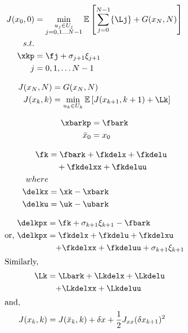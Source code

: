 \documentclass[varwidth]{standalone}
\providecommand{\Jzero}{J(x_0, 0)}
\providecommand{\Jk}{J(x_k, k)}
\providecommand{\JN}{J(x_N, N)}
\providecommand{\Jbark}{J(\bar{x}_k, k)}
\providecommand{\Jkp}{J(x_{k+1}, k+1)}
\providecommand{\Jkdelx}{\delta x }
\providecommand{\Jkdelx}{J_x \delta x_{k}}
\providecommand{\Jkdelxx}{\frac{1}{2} J_{xx} (\delta x_{k+1})^2}
\providecommand{\GN}{G(x_N, N)}
\providecommand{\noisekp}{\sigma_{k+1} \xi_{k+1}}
\providecommand{\noisejp}{\sigma_{j+1} \xi_{j+1}}
\begin{document}
\begin{minipage}{0.8\linewidth}

    \begin{align}
        \Jzero &= \min_{
            \substack{
                u_j \in U_j \\
                j = 0, 1 \dots N-1 \\
            }
        }
        \mathbb{E} \left[ \sum_{j=0}^{N-1} \{\Lj\} + \GN\right] \nonumber\\
        s.t. &{} \\
        \xkp &= \fj + \noisejp \nonumber\\
        j &= 0, 1, \dots N-1 \nonumber
    \end{align}

    \begin{align}
        \JN &= \GN  \\
        \Jk &= \min_{u_k \in U_k} \mathbb{E} \left[ 
            \Jkp + \Lk 
        \right]
    \end{align}

    \begin{align}
        \xbarkp &= \fbark \\
        \bar{x}_0 &= x_0 \nonumber
    \end{align}

    \begin{align}
        {\fk} &= {\fbark + \fkdelx + \fkdelu} \\
        {}  &\quad + {\fkdelxx + \fkdeluu} \nonumber\\
        {where} & {}\nonumber\\
        {\delkx} &= {\xk - \xbark} \nonumber\\
        {\delku} &= {\uk - \ubark} \nonumber
    \end{align}

    \begin{align}
        {\delkpx} &= {\fk + \noisekp - \fbark} \nonumber\\
        {\text{or, } \delkpx} &= {\fkdelx + \fkdelu + \fkdelxu} \\
        {} &\quad {+ \fkdelxx + \fkdeluu + \noisekp} \nonumber \\
        \intertext{Similarly, }
        {\Lk} &= {\Lbark + \Lkdelx + \Lkdelu} \nonumber\\
        {} &\quad {+ \Lkdelxx + \Lkdeluu} \\
        \intertext{and, }
        {\Jk} &= {\Jbark + \Jkdelx + \Jkdelxx}
    \end{align}
\end{minipage}
\end{document}
